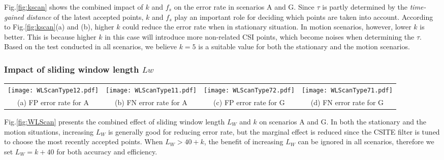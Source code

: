 \documentclass[conference]{IEEEtran}
\begin{document}
Fig.\ref{fig:kscan} shows the combined impact of $k$ and $f_s$ on the error rate in scenarios A and G. Since $\tau$ is partly determined by the \textit{time-gained distance} of the latest accepted points, $k$ and $f_s$ play an important role for deciding which points are taken into account.
According to Fig.\ref{fig:kscan}(a) and (b), higher $k$ could reduce the error rate when in stationary situation. In motion scenarios, however, lower $k$ is better. This is because higher $k$ in this case will introduce more non-related CSI points, which become noises when determining the $\tau$. Based on the test conducted in all scenarios, we believe $k=5$ is a suitable value for both the stationary and the motion scenarios.

\subsubsection{Impact of sliding window length $Lw$}

\begin{figure*}[!ht]
\begin{center}
\begin{tabular}{cccc}
\hspace{-0.25in}\texttt{[image: WLScanType12.pdf]} \hspace{-0.3in} &
\texttt{[image: WLScanType11.pdf]} \hspace{-0.3in} &
\texttt{[image: WLScanType72.pdf]} \hspace{-0.3in} &
\texttt{[image: WLScanType71.pdf]}  \\
(a) FP error rate for A&(b) FN error rate for A &(c) FP error rate for G&(d) FN error rate for G
\end{tabular}
\end{center}
\caption{The combined effect of value $k$ and sliding window length $L_w$ on error rate under two scenarios A and G.}
\vspace{-0.1in}
\label{fig:WLScan}
\end{figure*}

Fig.\ref{fig:WLScan} presents the combined effect of sliding window length $L_W$ and $k$ on scenarios A and G. In both the stationary and the motion situations, increasing $L_W$ is generally good for reducing error rate, but the marginal effect is reduced since the CSITE filter is tuned to choose the most recently accepted points. When $ L_W > 40+k$, the benefit of increasing $L_W$ can be ignored in all scenarios, therefore we set $L_W = k+40$ for both accuracy and efficiency.
\end{document}
